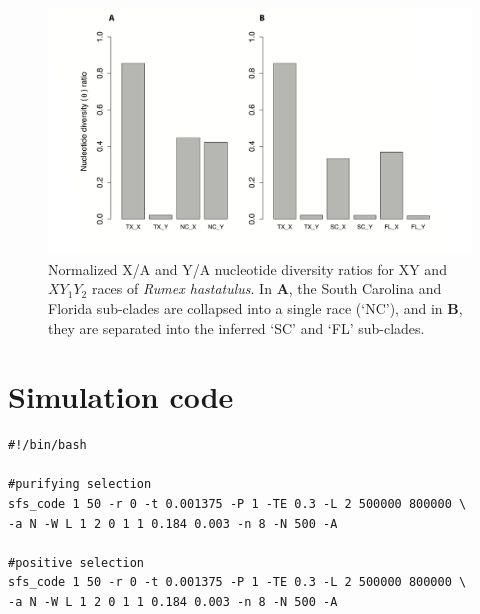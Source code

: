 \documentclass[9pt,onecolumn,twoside]{pnas-new}
\begin{document}
\begin{figure}[tbhp!]
\centering
\includegraphics[width=1\linewidth]{FigureS3.png}
\caption{Normalized X/A and Y/A nucleotide diversity ratios for XY and $XY_{1}Y_{2}$ races of \textit{Rumex hastatulus}. In \textbf{A}, the South Carolina and Florida sub-clades are collapsed into a single race (‘NC’), and in \textbf{B}, they are separated into the inferred ‘SC’ and ‘FL’ sub-clades.}
\label{figure:FigureS3}
\end{figure}

 

\newpage
\section*{Simulation code}

\begin{lstlisting}
#!/bin/bash

#purifying selection
sfs_code 1 50 -r 0 -t 0.001375 -P 1 -TE 0.3 -L 2 500000 800000 \
-a N -W L 1 2 0 1 1 0.184 0.003 -n 8 -N 500 -A

#positive selection
sfs_code 1 50 -r 0 -t 0.001375 -P 1 -TE 0.3 -L 2 500000 800000 \
-a N -W L 1 2 0 1 1 0.184 0.003 -n 8 -N 500 -A
\end{lstlisting}
\end{document}
